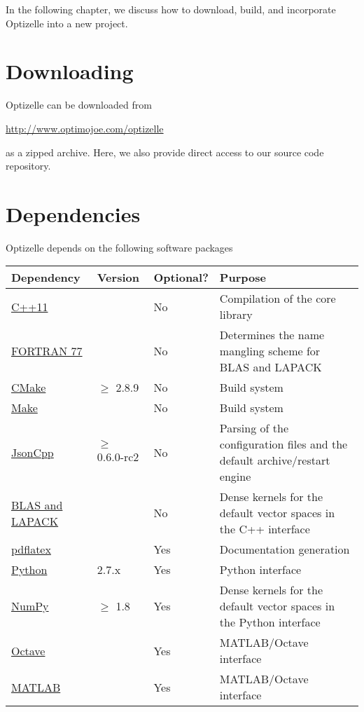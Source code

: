 \documentclass{report}
\begin{document}
        In the following chapter, we discuss how to download, build, and incorporate Optizelle into a new project.

\section{Downloading}

        Optizelle can be downloaded from
\begin{center}
    \mbox{\url{http://www.optimojoe.com/optizelle}}
\end{center}
as a zipped archive.  Here, we also provide direct access to our source code repository.

\section{Dependencies}

        Optizelle depends on the following software packages
\begin{center}\begin{tabular}{|l|l|l|p{}|}\hline
{\bf Dependency} & {\bf Version} & {\bf Optional?} & {\bf Purpose} \\\hline
\hyperref[tbl:compilers]{C++11} & & No & Compilation of the core library\\\hline
\hyperref[tbl:compilers]{FORTRAN 77} & & No & Determines the name mangling scheme for BLAS and LAPACK\\\hline
\href{http://cmake.org}{CMake} & $\geq$ 2.8.9 & No & Build system\\\hline
\hyperref[tbl:make]{Make} & & No & Build system\\\hline
\href{http://jsoncpp.sourceforge.net}{JsonCpp} & $\geq$ 0.6.0-rc2 & No & Parsing of the configuration files and the default archive/restart engine\\\hline
\hyperref[tbl:blaslapack]{BLAS and LAPACK} & & No & Dense kernels for the default vector spaces in the C++ interface\\\hline
\href{http://www.ctan.org}{pdflatex} & & Yes & Documentation generation \\\hline
\href{http://python.org}{Python} & 2.7.x & Yes & Python interface \\\hline
\href{http://www.numpy.org}{NumPy} & $\geq$ 1.8 & Yes & Dense kernels for the default vector spaces in the Python interface\\\hline
\href{https://www.gnu.org/software/octave}{Octave} & & Yes & MATLAB/Octave interface\\\hline
\href{http://www.mathworks.com/products/matlab}{MATLAB} & & Yes & MATLAB/Octave interface\\\hline
\end{tabular}\end{center}
\end{document}
